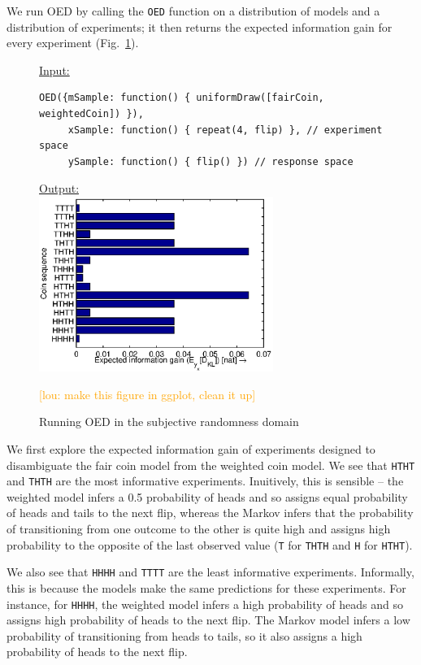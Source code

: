 \documentclass{article}
\newcommand{\lou}[1]{\textcolor{orange}{[lou: #1]}}
\begin{document}
We run OED by calling the \lstinline{OED} function on a distribution of models and a distribution of experiments; it then returns the expected information gain for every experiment (Fig.~\ref{fig:run-coin}).
%
\begin{figure}[h!]
\underline{\textsf{Input:}}
\begin{lstlisting}
OED({mSample: function() { uniformDraw([fairCoin, weightedCoin]) }),
     xSample: function() { repeat(4, flip) }, // experiment space
     ySample: function() { flip() }) // response space
\end{lstlisting}

\underline{\textsf{Output:}}\\
\includegraphics[width=3in]{img/coin.eps}
\caption{Running OED in the subjective randomness domain}
\lou{make this figure in ggplot, clean it up}
\label{fig:run-coin}
\end{figure}
%
We first explore the expected information gain of experiments designed to disambiguate the fair coin model from the weighted coin model.
We see that \lstinline{HTHT} and \lstinline{THTH} are the most informative experiments.
Inuitively, this is sensible -- the weighted model infers a 0.5 probability of heads and so assigns equal probability of heads and tails to the next flip, whereas the Markov infers that the probability of transitioning from one outcome to the other is quite high and assigns high probability to the opposite of the last observed value (\lstinline{T} for \lstinline{THTH} and \lstinline{H} for \lstinline{HTHT}).

We also see that \lstinline{HHHH} and \lstinline{TTTT} are the least informative experiments.
Informally, this is because the models make the same predictions for these experiments.
For instance, for \lstinline{HHHH}, the weighted model infers a high probability of heads and so assigns high probability of heads to the next flip.
The Markov model infers a low probability of transitioning from heads to tails, so it also assigns a high probability of heads to the next flip.
\end{document}
